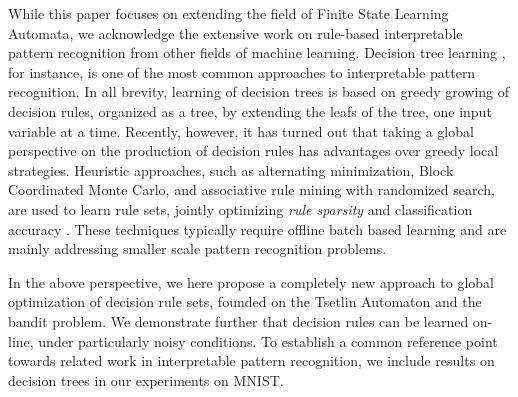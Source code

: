 \documentclass[11pt,a4paper]{article}
\begin{document}
While this paper focuses on extending the field of Finite State Learning Automata, we acknowledge the extensive work on rule-based interpretable pattern recognition from other fields of machine learning. Decision tree learning \cite{Quinlan1986}, for instance, is one of the most common approaches to interpretable pattern recognition. In all brevity, learning of decision trees is based on greedy growing of decision rules, organized as a tree, by extending the leafs of the tree, one input variable at a time.  Recently, however, it has turned out that taking a global perspective on the production of decision rules has advantages over greedy local strategies. Heuristic approaches, such as alternating minimization, Block Coordinated Monte Carlo, and associative rule mining with randomized search, are used to learn rule sets, jointly optimizing \emph{rule sparsity} and classification accuracy \cite{GuolongSu2016,Wang2017}. These techniques typically require offline batch based learning and are mainly addressing smaller scale pattern recognition problems. 

In the above perspective, we here propose a completely new approach to global optimization of decision rule sets, founded on the Tsetlin Automaton and the bandit problem. We demonstrate further that decision rules can be learned on-line, under particularly noisy conditions. To establish a common reference point towards related work in interpretable pattern recognition, we include results on decision trees in our experiments on MNIST.
\end{document}
